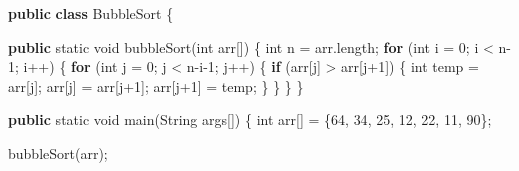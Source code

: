 \documentclass[
  letterpaper,
  DIV=11,
  numbers=noendperiod]{scrreprt}
\newenvironment{Shaded}{\begin{snugshade}}{\end{snugshade}}
\newcommand{\BuiltInTok}[1]{\textcolor[rgb]{0.00,0.23,0.31}{#1}}
\newcommand{\ControlFlowTok}[1]{\textcolor[rgb]{0.00,0.23,0.31}{\textbf{#1}}}
\newcommand{\DataTypeTok}[1]{\textcolor[rgb]{0.68,0.00,0.00}{#1}}
\newcommand{\DecValTok}[1]{\textcolor[rgb]{0.68,0.00,0.00}{#1}}
\newcommand{\FunctionTok}[1]{\textcolor[rgb]{0.28,0.35,0.67}{#1}}
\newcommand{\KeywordTok}[1]{\textcolor[rgb]{0.00,0.23,0.31}{\textbf{#1}}}
\newcommand{\NormalTok}[1]{\textcolor[rgb]{0.00,0.23,0.31}{#1}}
\newcommand{\OperatorTok}[1]{\textcolor[rgb]{0.37,0.37,0.37}{#1}}
\begin{document}
\begin{Shaded}
\begin{Highlighting}[]
\KeywordTok{public} \KeywordTok{class}\NormalTok{ BubbleSort }\OperatorTok{\{}

    \KeywordTok{public} \DataTypeTok{static} \DataTypeTok{void} \FunctionTok{bubbleSort}\OperatorTok{(}\DataTypeTok{int}\NormalTok{ arr}\OperatorTok{[])} \OperatorTok{\{}
        \DataTypeTok{int}\NormalTok{ n }\OperatorTok{=}\NormalTok{ arr}\OperatorTok{.}\FunctionTok{length}\OperatorTok{;}
        \ControlFlowTok{for} \OperatorTok{(}\DataTypeTok{int}\NormalTok{ i }\OperatorTok{=} \DecValTok{0}\OperatorTok{;}\NormalTok{ i }\OperatorTok{\textless{}}\NormalTok{ n}\OperatorTok{{-}}\DecValTok{1}\OperatorTok{;}\NormalTok{ i}\OperatorTok{++)} \OperatorTok{\{}
            \ControlFlowTok{for} \OperatorTok{(}\DataTypeTok{int}\NormalTok{ j }\OperatorTok{=} \DecValTok{0}\OperatorTok{;}\NormalTok{ j }\OperatorTok{\textless{}}\NormalTok{ n}\OperatorTok{{-}}\NormalTok{i}\OperatorTok{{-}}\DecValTok{1}\OperatorTok{;}\NormalTok{ j}\OperatorTok{++)} \OperatorTok{\{}
                \ControlFlowTok{if} \OperatorTok{(}\NormalTok{arr}\OperatorTok{[}\NormalTok{j}\OperatorTok{]} \OperatorTok{\textgreater{}}\NormalTok{ arr}\OperatorTok{[}\NormalTok{j}\OperatorTok{+}\DecValTok{1}\OperatorTok{])} \OperatorTok{\{}
                    \DataTypeTok{int}\NormalTok{ temp }\OperatorTok{=}\NormalTok{ arr}\OperatorTok{[}\NormalTok{j}\OperatorTok{];}
\NormalTok{                    arr}\OperatorTok{[}\NormalTok{j}\OperatorTok{]} \OperatorTok{=}\NormalTok{ arr}\OperatorTok{[}\NormalTok{j}\OperatorTok{+}\DecValTok{1}\OperatorTok{];}
\NormalTok{                    arr}\OperatorTok{[}\NormalTok{j}\OperatorTok{+}\DecValTok{1}\OperatorTok{]} \OperatorTok{=}\NormalTok{ temp}\OperatorTok{;}
                \OperatorTok{\}}
            \OperatorTok{\}}
        \OperatorTok{\}}
    \OperatorTok{\}}

    \KeywordTok{public} \DataTypeTok{static} \DataTypeTok{void} \FunctionTok{main}\OperatorTok{(}\BuiltInTok{String}\NormalTok{ args}\OperatorTok{[])} \OperatorTok{\{}
        \DataTypeTok{int}\NormalTok{ arr}\OperatorTok{[]} \OperatorTok{=} \OperatorTok{\{}\DecValTok{64}\OperatorTok{,} \DecValTok{34}\OperatorTok{,} \DecValTok{25}\OperatorTok{,} \DecValTok{12}\OperatorTok{,} \DecValTok{22}\OperatorTok{,} \DecValTok{11}\OperatorTok{,} \DecValTok{90}\OperatorTok{\};}

        \FunctionTok{bubbleSort}\OperatorTok{(}\NormalTok{arr}\OperatorTok{);}


\end{Highlighting}
\end{Shaded}
\end{document}
